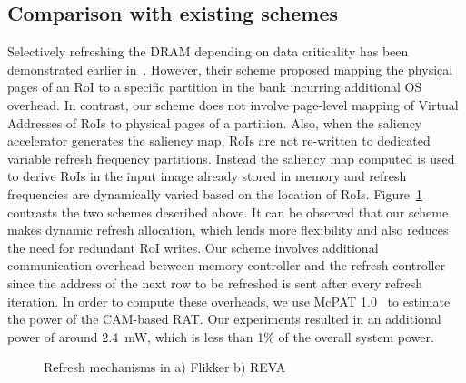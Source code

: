 \subsection{Comparison with existing schemes}
Selectively refreshing the DRAM depending on data criticality has been demonstrated earlier in~\cite{Liu2011}. 
However, their scheme proposed mapping the physical pages of an RoI to a specific partition in the bank incurring additional OS overhead. In contrast, our scheme does not involve page-level mapping of Virtual Addresses of RoIs to physical pages of a partition. 
Also, when the saliency accelerator generates the saliency map, RoIs are not re-written to dedicated variable refresh frequency partitions. Instead the saliency map computed is used to derive RoIs in the input image already stored in memory and refresh frequencies are dynamically varied based on the location of RoIs.
Figure~\ref{fig:reva-refresh} contrasts the two schemes described above. It can be observed that our scheme makes dynamic refresh allocation, which lends more flexibility and also reduces the need for redundant RoI writes.
Our scheme involves additional communication overhead between memory controller and the refresh controller since the address of the next row to be refreshed is sent after every refresh iteration. 
In order to compute these overheads, we use McPAT 1.0~\cite{mcpat} to estimate the power of the CAM-based RAT. Our experiments resulted in an additional power of around 2.4~mW, which is less than 1\% of the overall system power.

\begin{figure}[ht!]
\centering
{}
\caption{\label{fig:reva-refresh} Refresh mechanisms in a) Flikker  b) REVA}
\vspace{-0.2in}
\end{figure}
